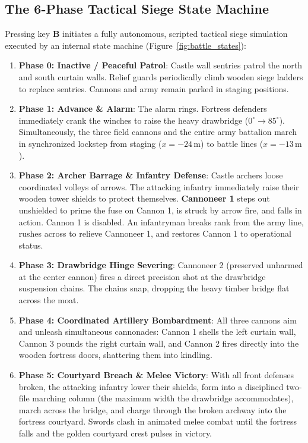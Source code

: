 \documentclass[11pt,a4paper]{article}
\newcommand{\key}[1]{\textsf{\small\textbf{#1}}}
\begin{document}
\subsection{The 6-Phase Tactical Siege State Machine}
Pressing key \key{B} initiates a fully autonomous, scripted tactical siege simulation executed by an internal state machine (Figure~\ref{fig:battle_states}):

\begin{enumerate}[itemsep=2pt,topsep=2pt]
  \item \textbf{Phase 0: Inactive / Peaceful Patrol}: Castle wall sentries patrol the north and south curtain walls. Relief guards periodically climb wooden siege ladders to replace sentries. Cannons and army remain parked in staging positions.
  \item \textbf{Phase 1: Advance \& Alarm}: The alarm rings. Fortress defenders immediately crank the winches to raise the heavy drawbridge ($0^\circ \to 85^\circ$). Simultaneously, the three field cannons and the entire army battalion march in synchronized lockstep from staging ($x = -24\,\text{m}$) to battle lines ($x = -13\,\text{m}$).
  \item \textbf{Phase 2: Archer Barrage \& Infantry Defense}: Castle archers loose coordinated volleys of arrows. The attacking infantry immediately raise their wooden tower shields to protect themselves. \textbf{Cannoneer 1} steps out unshielded to prime the fuse on Cannon 1, is struck by arrow fire, and falls in action. Cannon 1 is disabled. An infantryman breaks rank from the army line, rushes across to relieve Cannoneer 1, and restores Cannon 1 to operational status.
  \item \textbf{Phase 3: Drawbridge Hinge Severing}: Cannoneer 2 (preserved unharmed at the center cannon) fires a direct precision shot at the drawbridge suspension chains. The chains snap, dropping the heavy timber bridge flat across the moat.
  \item \textbf{Phase 4: Coordinated Artillery Bombardment}: All three cannons aim and unleash simultaneous cannonades: Cannon 1 shells the left curtain wall, Cannon 3 pounds the right curtain wall, and Cannon 2 fires directly into the wooden fortress doors, shattering them into kindling.
  \item \textbf{Phase 5: Courtyard Breach \& Melee Victory}: With all front defenses broken, the attacking infantry lower their shields, form into a disciplined two-file marching column (the maximum width the drawbridge accommodates), march across the bridge, and charge through the broken archway into the fortress courtyard. Swords clash in animated melee combat until the fortress falls and the golden courtyard crest pulses in victory.
\end{enumerate}
\end{document}
